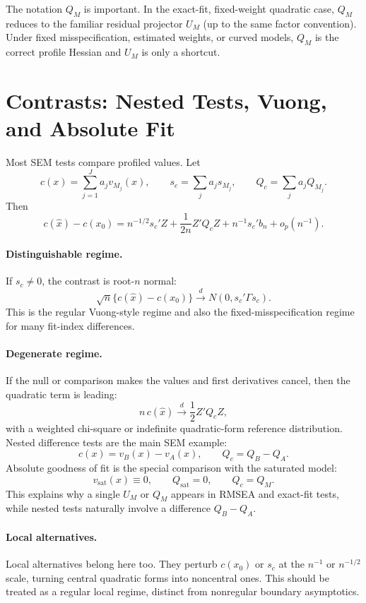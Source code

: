 \documentclass[11pt]{article}
\newcommand{\dto}{\xrightarrow{d}}
\theoremstyle{plain}
\theoremstyle{remark}
\begin{document}
The notation $Q_M$ is important. In the exact-fit, fixed-weight quadratic case,
$Q_M$ reduces to the familiar residual projector $U_M$ (up to the same factor
convention). Under fixed misspecification, estimated weights, or curved models,
$Q_M$ is the correct profile Hessian and $U_M$ is only a shortcut.

\section{Contrasts: Nested Tests, Vuong, and Absolute Fit}

Most SEM tests compare profiled values. Let
\[
  c(x)=\sum_{j=1}^J a_j v_{M_j}(x),
  \qquad
  s_c=\sum_j a_j s_{M_j},
  \qquad
  Q_c=\sum_j a_j Q_{M_j}.
\]
Then
\begin{equation}\label{eq:contrast-expansion}
  c(\hat x)-c(x_0)
  =
  n^{-1/2}s_c'Z
  +\frac{1}{2n}Z'Q_cZ
  +n^{-1}s_c'b_n
  +o_p(n^{-1}).
\end{equation}

\paragraph{Distinguishable regime.}
If $s_c\ne0$, the contrast is root-$n$ normal:
\[
  \sqrt n\{c(\hat x)-c(x_0)\}
  \dto
  N(0,s_c'\Gamma s_c).
\]
This is the regular Vuong-style regime and also the fixed-misspecification
regime for many fit-index differences.

\paragraph{Degenerate regime.}
If the null or comparison makes the values and first derivatives cancel, then
the quadratic term is leading:
\[
  n\,c(\hat x)
  \dto
  \frac12 Z'Q_cZ,
\]
with a weighted chi-square or indefinite quadratic-form reference distribution.
Nested difference tests are the main SEM example:
\[
  c(x)=v_B(x)-v_A(x),
  \qquad
  Q_c=Q_B-Q_A.
\]
Absolute goodness of fit is the special comparison with the saturated model:
\[
  v_{\mathrm{sat}}(x)\equiv0,
  \qquad
  Q_{\mathrm{sat}}=0,
  \qquad
  Q_c=Q_M.
\]
This explains why a single $U_M$ or $Q_M$ appears in RMSEA and exact-fit tests,
while nested tests naturally involve a difference $Q_B-Q_A$.

\paragraph{Local alternatives.}
Local alternatives belong here too. They perturb $c(x_0)$ or $s_c$ at the
$n^{-1}$ or $n^{-1/2}$ scale, turning central quadratic forms into noncentral
ones. This should be treated as a regular local regime, distinct from
nonregular boundary asymptotics.
\end{document}
